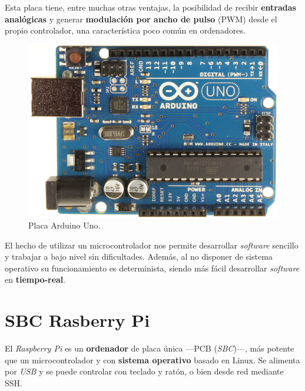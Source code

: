 \smallskip

Esta placa tiene, entre muchas otras ventajas, la posibilidad de recibir \textbf{entradas analógicas} y generar \textbf{modulación por ancho de pulso} (\acrshort{PWM}) desde el propio controlador, una característica poco común en ordenadores.

\smallskip

\begin{figure}[H]
	\noindent \begin{centering}
		\includegraphics[width=\linewidth/2]{capitulo3/arduino}
		\par\end{centering}
	\smallskip
	\caption{\label{fig:arduino} Placa Arduino Uno.}
\end{figure} 

\smallskip

El hecho de utilizar un microcontrolador nos permite desarrollar \textit{software} sencillo y trabajar a bajo nivel sin dificultades. Además, al no disponer de sistema operativo su funcionamiento es determinista, siendo más fácil desarrollar \textit{software} en \textbf{tiempo-real}.

\newpage

\section{SBC Rasberry Pi}

El \textit{Raspberry Pi} es un \textbf{ordenador} de placa única ---\acrshort{PCB} (\textit{\acrlong{SBC}})---, más potente que un microcontrolador y con \textbf{sistema operativo} basado en Linux. Se alimenta por \textit{USB} y se puede controlar con teclado y ratón, o bien desde red mediante \acrshort{SSH}. 

